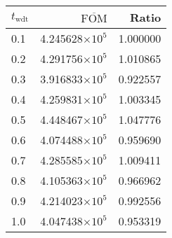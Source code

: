 \begin{tabular}{lrr}
\toprule
$t_{\mathrm{wdt}}$ & $\overline{\mathrm{FOM}}$ &    Ratio \\
\midrule
               0.1 &   4.245628$\times 10^{5}$ & 1.000000 \\
               0.2 &   4.291756$\times 10^{5}$ & 1.010865 \\
               0.3 &   3.916833$\times 10^{5}$ & 0.922557 \\
               0.4 &   4.259831$\times 10^{5}$ & 1.003345 \\
               0.5 &   4.448467$\times 10^{5}$ & 1.047776 \\
               0.6 &   4.074488$\times 10^{5}$ & 0.959690 \\
               0.7 &   4.285585$\times 10^{5}$ & 1.009411 \\
               0.8 &   4.105363$\times 10^{5}$ & 0.966962 \\
               0.9 &   4.214023$\times 10^{5}$ & 0.992556 \\
               1.0 &   4.047438$\times 10^{5}$ & 0.953319 \\
\bottomrule
\end{tabular}

